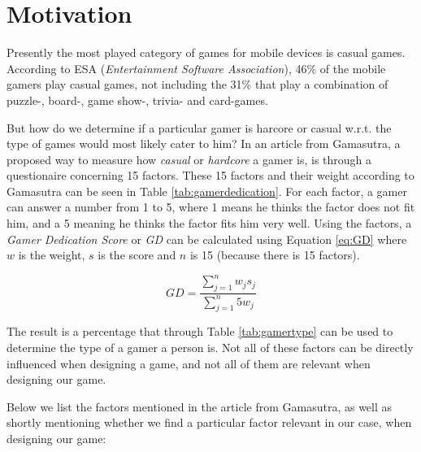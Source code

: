 \section{Motivation} \label{sec:motivation} 
Presently the most played category of games for mobile devices is casual games.
According to ESA\cite{ESA}\cite{ESApdf} (\textit{Entertainment Software Association}), 46\% of the mobile gamers play casual games, not including the 31\% that play a combination of puzzle-, board-, game show-, trivia- and card-games.

But how do we determine if a particular gamer is harcore or casual w.r.t. the type of games would most likely cater to him?
In an article from Gamasutra, a proposed way to measure how \textit{casual} or \textit{hardcore} a gamer is, is through a questionaire concerning 15 factors\cite{casual_vs_hardcore}.
These 15 factors and their weight according to Gamasutra can be seen in Table \ref{tab:gamerdedication}\cite{casual_vs_hardcore}.
For each factor, a gamer can answer a number from 1 to 5, where 1 means he thinks the factor does not fit him, and a 5 meaning he thinks the factor fits him very well.
Using the factors, a \emph{Gamer Dedication Score} or \emph{GD} can be calculated using Equation \ref{eq:GD} where $w$ is the weight, $s$ is the score and $n$ is 15 (because there is 15 factors).

\begin{equation}\label{eq:GD}
GD = \frac{\sum\limits_{j=1}^n w_j s_j}{\sum\limits_{j=1}^n 5 w_j}
\end{equation}

The result is a percentage that through Table \ref{tab:gamertype} can be used to determine the type of a gamer a person is\cite{casual_vs_hardcore}.
Not all of these factors can be directly influenced when designing a game, and not all of them are relevant when designing our game.

Below we list the factors mentioned in the article from Gamasutra, as well as shortly mentioning whether we find a particular factor relevant in our case, when designing our game:


